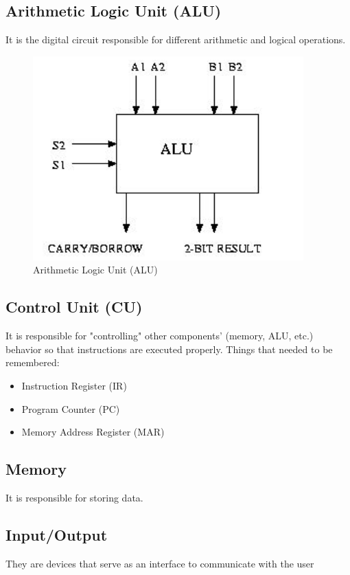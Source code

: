 \documentclass[9pt,twocolumn]{article}
\begin{document}
  \subsection*{Arithmetic Logic Unit (ALU)}
    It is the digital circuit responsible for different arithmetic and logical operations.
    \begin{figure}[h]
      \centering
      \includegraphics[scale=0.5]{./assets/001/alu.png}
      \caption{Arithmetic Logic Unit (ALU)}
    \end{figure}

  \subsection*{Control Unit (CU)}
    It is responsible for "controlling" other components’ (memory, ALU, etc.) behavior so that instructions are executed properly.
    Things that needed to be remembered:
    \begin{itemize}
      \item Instruction Register (IR)
      \item Program Counter (PC)
      \item Memory Address Register (MAR)
    \end{itemize}

  \subsection*{Memory}
    It is responsible for storing data.

  \subsection*{Input/Output}
    They are devices that serve as an interface to communicate with the user
\end{document}
